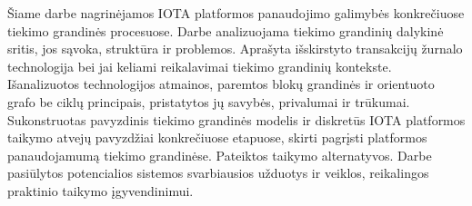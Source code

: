 

Šiame darbe nagrinėjamos IOTA platformos panaudojimo galimybės konkrečiuose tiekimo grandinės procesuose. 
Darbe analizuojama tiekimo grandinių dalykinė sritis, jos sąvoka, struktūra ir problemos.
Aprašyta išskirstyto transakcijų žurnalo technologija bei jai keliami reikalavimai tiekimo grandinių kontekste. Išanalizuotos technologijos atmainos, paremtos blokų grandinės ir orientuoto grafo be ciklų principais, pristatytos jų savybės, privalumai ir trūkumai. 
Sukonstruotas pavyzdinis tiekimo grandinės modelis ir diskretūs IOTA platformos taikymo atvejų pavyzdžiai konkrečiuose etapuose, skirti pagrįsti platformos panaudojamumą tiekimo grandinėse. Pateiktos taikymo alternatyvos. 
Darbe pasiūlytos potencialios sistemos svarbiausios užduotys ir veiklos, reikalingos praktinio taikymo įgyvendinimui.


